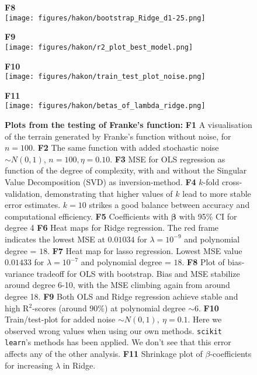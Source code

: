 \documentclass{article}
\begin{document}
\begin{figure}[H]
{\begin{minipage}{\textwidth}
        \begin{minipage}{0.34\textwidth}
            \centering
            \textbf{F8} \label{fig:F8} \\  %
            \texttt{[image: figures/hakon/bootstrap\_Ridge\_d1-25.png]}
        \end{minipage}
        \begin{minipage}{0.34\textwidth}
            \centering
            \textbf{F9} \label{fig:F9} \\  %
            \texttt{[image: figures/hakon/r2\_plot\_best\_model.png]}
        \end{minipage}
        \hfill
        \begin{minipage}{0.32\textwidth}
            \centering
            \textbf{F10} \label{fig:F10} \\  %
            \texttt{[image: figures/hakon/train\_test\_plot\_noise.png]}
        \end{minipage}
        \begin{minipage}{0.32\textwidth}
            \centering
            \textbf{F11} \label{fig:F11} \\  %
            \texttt{[image: figures/hakon/betas\_of\_lambda\_ridge.png]}
        \end{minipage}
             
        \vspace{1em}
        \caption*{\textbf{Plots from the testing of Franke’s function: }\textbf{F1} A visualisation of the terrain generated by Franke's function without noise, for $n=100$. \textbf{F2} The same function with added stochastic noise $\sim N(0, 1)$, $n =100, \eta = 0.10$. \textbf{F3} MSE for OLS regression as function of the degree of complexity, with and without the Singular Value Decomposition (SVD) as inversion-method. \textbf{F4} $k$-fold cross-validation, demonstrating that higher values of $k$ lead to more stable error estimates. $k = 10$ strikes a good balance between accuracy and computational efficiency. \textbf{F5} Coefficients with $\bm{\beta}$ with 95\% CI for degree 4 \textbf{F6} Heat maps for Ridge regression. The red frame indicates the lowest MSE at $0.01034$ for $\lambda=10^{-9}$ and polynomial degree = $18$. \textbf{F7} Heat map for lasso regression. Lowest MSE value $0.01433$ for $\lambda=10^{-7}$ and polynomial degree = $18$. \textbf{F8} Plot of bias-variance tradeoff for OLS with bootstrap. Bias and MSE stabilize around degree 6-10, with the MSE climbing again from around degree 18. \textbf{F9} Both OLS and Ridge regression achieve stable and high R$^2$-scores (around $90\%$) at polynomial degree $\sim6$. \textbf{F10} Train/test-plot for added noise $\sim N(0, 1),\ \eta=0.1$. Here we observed wrong values when using our own methods. \texttt{scikit learn}’s methods has been applied. We don’t see that this error affects any of the other analysis. \textbf{F11} Shrinkage plot of $\beta$-coefficients for increasing $\lambda$ in Ridge.} 
        \label{fig:franke_figs}
    \end{minipage}
    }
\end{figure}
\end{document}
